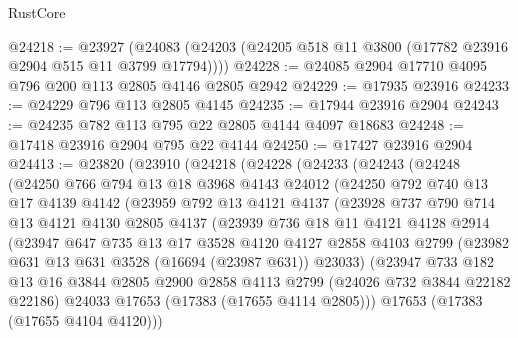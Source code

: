 \begin{lexlean}{RustCore}
\begin{coremodule}
@24218 := @23927
    (@24083 (@24203 (@24205 @518 @11 @3800 (@17782 @23916 @2904 @515 @11 @3799 @17794))))
@24228 := @24085 @2904 @17710 @4095 @796 @200 @113 @2805 @4146 @2805 @2942
@24229 := @17935 @23916
@24233 := @24229 @796 @113 @2805 @4145
@24235 := @17944 @23916 @2904
@24243 := @24235 @782 @113 @795 @22 @2805 @4144 @4097 @18683
@24248 := @17418 @23916 @2904 @795 @22 @4144
@24250 := @17427 @23916 @2904
@24413 := @23820
    (@23910
      (@24218
        (@24228
          (@24233
            (@24243
              (@24248
                (@24250
                  @766
                  @794
                  @13
                  @18
                  @3968
                  @4143
                  @24012
                  (@24250
                    @792
                    @740
                    @13
                    @17
                    @4139
                    @4142
                    (@23959
                      @792
                      @13
                      @4121
                      @4137
                      (@23928
                        @737
                        @790
                        @714
                        @13
                        @4121
                        @4130
                        @2805
                        @4137
                        (@23939
                          @736
                          @18
                          @11
                          @4121
                          @4128
                          @2914
                          (@23947
                            @647
                            @735
                            @13
                            @17
                            @3528
                            @4120
                            @4127
                            @2858
                            @4103
                            @2799
                            (@23982 @631 @13 @631 @3528 (@16694 (@23987 @631)) @23033)
                            (@23947
                              @733
                              @182
                              @13
                              @16
                              @3844
                              @2805
                              @2900
                              @2858
                              @4113
                              @2799
                              (@24026 @732 @3844 @22182 @22186)
                              @24033
                              @17653
                              (@17383 (@17655 @4114 @2805)))
                            @17653
                            (@17383 (@17655 @4104 @4120)))

\end{coremodule}
\end{lexlean}
